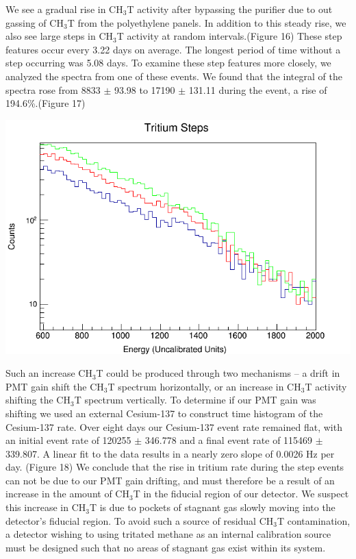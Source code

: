 \documentclass[a4paper,12pt]{article}
\begin{document}
We see a gradual rise in CH$_3$T activity after bypassing the purifier due to out gassing of CH$_3$T from the polyethylene panels.  In addition to this steady rise, we also see large steps in CH$_3$T activity at random intervals.(Figure 16)  These step features occur every 3.22 days on average.  The longest period of time without a step occurring was 5.08 days. To examine these step features more closely, we analyzed the spectra from one of these events.  We found that the integral of the spectra rose from 8833 $\pm$ 93.98 to 17190 $\pm$ 131.11 during the event, a rise of 194.6\%.(Figure 17)  

\begin{center}
\includegraphics[scale=0.5]{Steps_Overlay.png}
\end{center}

Such an increase CH$_3$T could be produced through two mechanisms -- a drift in PMT gain shift the CH$_3$T spectrum horizontally, or an increase in CH$_3$T activity shifting the CH$_3$T spectrum vertically.  To determine if our PMT gain was shifting we used an external Cesium-137 to construct time histogram of the Cesium-137 rate.  Over eight days our Cesium-137 event rate remained flat, with an initial event rate of 120255 $\pm$ 346.778 and a final event rate of 115469 $\pm$ 339.807.  A linear fit to the data results in a nearly zero slope of 0.0026 Hz per day.  (Figure 18) We conclude that the rise in tritium rate during the step events can not be due to our PMT gain drifting, and must therefore be a result of an increase in the amount of CH$_3$T in the fiducial region of our detector.  We suspect this increase in CH$_3$T is due to pockets of stagnant gas slowly moving into the detector's fiducial region.  To avoid such a source of residual CH$_3$T contamination, a detector wishing to using tritated methane as an internal calibration source must be designed such that no areas of stagnant gas exist within its system.
\end{document}
